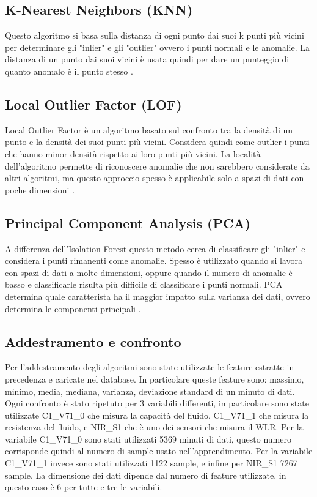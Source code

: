 \subsection{K-Nearest Neighbors (KNN)}
Questo algoritmo si basa sulla distanza di ogni punto dai suoi k punti più vicini per determinare gli "inlier" e gli "outlier" ovvero i punti normali e le anomalie. La distanza di un punto dai suoi vicini è usata quindi per dare un punteggio di quanto anomalo è il punto stesso \cite{KNN}.	

\subsection{Local Outlier Factor (LOF)}
Local Outlier Factor è un algoritmo basato sul confronto tra la densità di un punto e la densità dei suoi punti più vicini. Considera quindi come outlier i punti che hanno minor densità rispetto ai loro punti più vicini. La località dell'algoritmo permette di riconoscere anomalie che non sarebbero considerate da altri algoritmi, ma questo approccio spesso è applicabile solo a spazi di dati con poche dimensioni \cite{LOF}.

\subsection{Principal Component Analysis (PCA)}
A differenza dell'Isolation Forest questo metodo cerca di classificare gli "inlier" e considera i punti rimanenti come anomalie. Spesso è utilizzato quando si lavora con spazi di dati a molte dimensioni, oppure quando il numero di anomalie è basso e classificarle risulta più difficile di classificare i punti normali. PCA determina quale caratterista ha il maggior impatto sulla varianza dei dati, ovvero determina le componenti principali \cite{PCA}.

\subsection{Addestramento e confronto} \label{AddestramentoEConfronto}

Per l'addestramento degli algoritmi sono state utilizzate le feature estratte in precedenza e caricate nel database. In particolare queste feature sono: massimo, minimo, media, mediana, varianza, deviazione standard di un minuto di dati. Ogni confronto è stato ripetuto per 3 variabili differenti, in particolare sono state utilizzate C1\_V71\_0 che misura la capacità del fluido, C1\_V71\_1 che misura la resistenza del fluido, e NIR\_S1 che è uno dei sensori che misura il WLR.
Per la variabile C1\_V71\_0 sono stati utilizzati 5369 minuti di dati, questo numero corrisponde quindi al numero di sample usato nell'apprendimento. Per la variabile C1\_V71\_1 invece sono stati utilizzati 1122 sample, e infine per NIR\_S1 7267 sample.
La dimensione dei dati dipende dal numero di feature utilizzate, in questo caso è 6 per tutte e tre le variabili.

